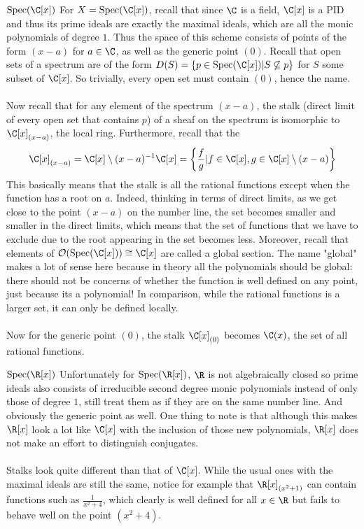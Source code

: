 \documentclass[a4paper]{article}
\begin{document}
\begin{eg}{$\text{Spec}(\C[x])$}{} For $X=\text{Spec}(\C[x])$, recall that since $\C$ is a field, $\C[x]$ is a PID and thus its prime ideals are exactly the maximal ideals, which are all the monic polynomials of degree $1$. Thus the space of this scheme consists of points of the form $(x-a)$ for $a\in\C$, as well as the generic point $(0)$. Recall that open sets of a spectrum are of the form $D(S)=\{p\in\text{Spec}(\C[x])|S\not\subseteq p\}$ for $S$ some subset of $\C[x]$. So trivially, every open set must contain $(0)$, hence the name. \\~\\
Now recall that for any element of the spectrum $(x-a)$, the stalk (direct limit of every open set that contains $p$) of a sheaf on the spectrum is isomorphic to $\C[x]_{(x-a)}$, the local ring. Furthermore, recall that the $$\C[x]_{(x-a)}=\C[x]\setminus(x-a)^{-1}\C[x]=\left\{\frac{f}{g}|f\in\C[x], g\in\C[x]\setminus(x-a)\right\}$$ This basically means that the stalk is all the rational functions except when the function has a root on $a$. Indeed, thinking in terms of direct limits, as we get close to the point $(x-a)$ on the number line, the set becomes smaller and smaller in the direct limits, which means that the set of functions that we have to exclude due to the root appearing in the set becomes less. Moreover, recall that elements of $\mathcal{O}(\text{Spec}(\C[x]))\cong\C[x]$ are called a global section. The name "global" makes a lot of sense here because in theory all the polynomials should be global: there should not be concerns of whether the function is well defined on any point, just because its a polynomial! In comparison, while the rational functions is a larger set, it can only be defined locally. \\~\\
Now for the generic point $(0)$, the stalk $\C[x]_{(0)}$ becomes $\C(x)$, the set of all rational functions. 
\end{eg}

\begin{eg}{$\text{Spec}(\R[x])$}{} Unfortunately for $\text{Spec}(\R[x])$, $\R$ is not algebraically closed so prime ideals also consists of irreducible second degree monic polynomials instead of only those of degree $1$, still treat them as if they are on the same number line. And obviously the generic point as well. One thing to note is that although this makes $\R[x]$ look a lot like $\C[x]$ with the inclusion of those new polynomials, $\R[x]$ does not make an effort to distinguish conjugates. \\~\\
Stalks look quite different than that of $\C[x]$. While the usual ones with the maximal ideals are still the same, notice for example that $\R[x]_{(x^2+1)}$ can contain functions such as $\frac{1}{x^2+4}$, which clearly is well defined for all $x\in\R$ but fails to behave well on the point $(x^2+4)$. 
\end{eg}
\end{document}
